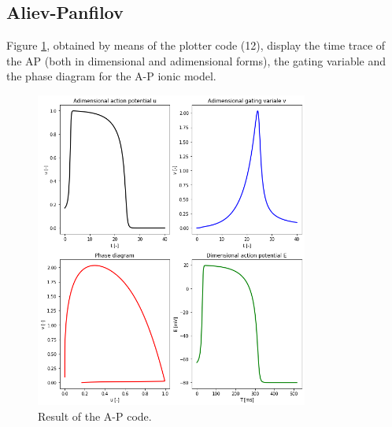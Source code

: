 \documentclass[11pt,a4paper]{article}
\begin{document}
\subsection{Aliev-Panfilov}\label{sec:results_ap}
Figure \ref{fig:ap}, obtained by means of the plotter code (12), display the time trace of the AP (both in dimensional and adimensional forms), the gating variable and the phase diagram for the A-P ionic model.  

\begin{figure}[t]
	\centering
	\includegraphics[width=0.8\textwidth]{./Images/A-P.png}
	\caption{Result of the A-P code.}
	\label{fig:ap}
\end{figure} 
\end{document}

